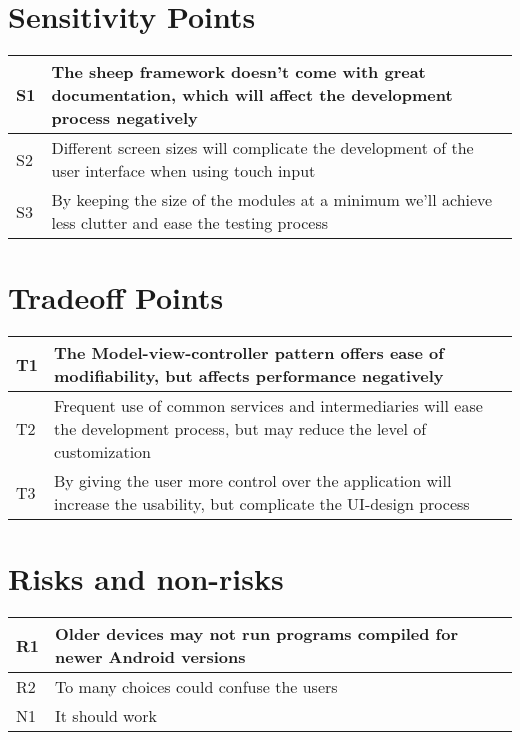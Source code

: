 \section{Sensitivity Points}

\begin{tabular}{|m{}|m{}|}
  \hline
  S1 & The sheep framework doesn't come with great documentation, which will
  affect the development process negatively \\ \hline
  S2 & Different screen sizes will complicate the development of the user
  interface when using touch input \\ \hline
  S3 & By keeping the size of the modules at a minimum we'll achieve less
  clutter and ease the testing process \\ \hline 
\end{tabular}

\section{Tradeoff Points}
\begin{tabular}{|m{}|m{}|}
  \hline
  T1 & The Model-view-controller pattern offers ease of modifiability, but
  affects performance negatively \\ \hline
  T2 & Frequent use of common services and intermediaries will ease the
  development process, but may reduce the
  level of customization \\ \hline
  T3 & By giving the user more control over the application will increase the
  usability, but complicate the UI-design process \\ \hline
\end{tabular}

\section{Risks and non-risks}
\begin{tabular}{|m{}|m{}|}
  \hline
  R1 & Older devices may not run programs compiled for newer Android
  versions \\ \hline
  R2 & To many choices could confuse the users \\ \hline
  N1 & It should work \\ \hline
\end{tabular}
